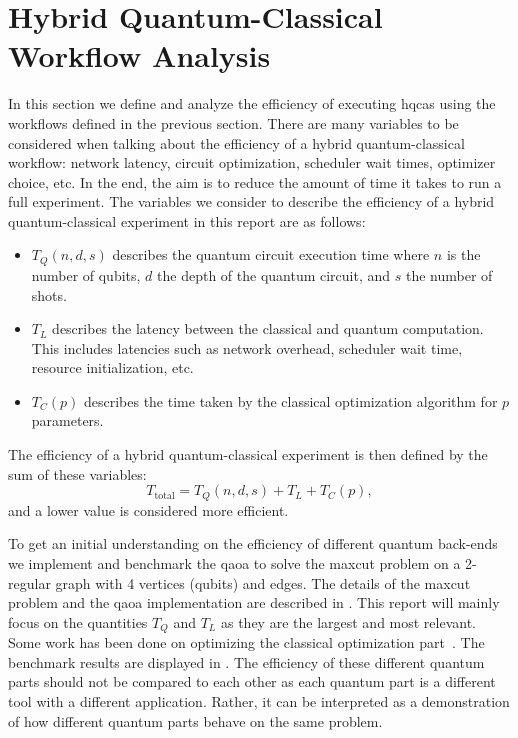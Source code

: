 \section{Hybrid Quantum-Classical Workflow Analysis}
In this section we define and analyze the efficiency of executing \glspl{hqca} using the workflows defined in the previous section.
There are many variables to be considered when talking about the efficiency of a hybrid quantum-classical workflow: network latency, circuit optimization, scheduler wait times, optimizer choice, etc.
In the end, the aim is to reduce the amount of time it takes to run a full experiment.
The variables we consider to describe the efficiency of a hybrid quantum-classical experiment in this report are as follows:
\begin{itemize}
    \item $T_Q(n, d, s)$ describes the quantum circuit execution time where $n$ is the number of qubits, $d$ the depth of the quantum circuit, and $s$ the number of shots.
    \item $T_L$ describes the latency between the classical and quantum computation. This includes latencies such as network overhead, scheduler wait time, resource initialization, etc.
    \item $T_C(p)$ describes the time taken by the classical optimization algorithm for $p$ parameters.
\end{itemize}
The efficiency of a hybrid quantum-classical experiment is then defined by the sum of these variables:
\begin{equation}
T_\text{total} = T_Q(n, d, s) + T_L + T_C(p),
\end{equation}
and a lower value is considered more efficient.

To get an initial understanding on the efficiency of different quantum back-ends we implement and benchmark the \gls{qaoa} to solve the \gls{maxcut} problem on a 2-regular graph with 4 vertices (qubits) and edges.
The details of the \gls{maxcut} problem and the \gls{qaoa} implementation are described in .
This report will mainly focus on the quantities $T_Q$ and $T_L$ as they are the largest and most relevant.
Some work has been done on optimizing the classical optimization part~\cite{lavrijsen2020classical, sung2020exploration}.
The benchmark results are displayed in .
The efficiency of these different quantum parts should not be compared to each other as each quantum part is a different tool with a different application.
Rather, it can be interpreted as a demonstration of how different quantum parts behave on the same problem.

